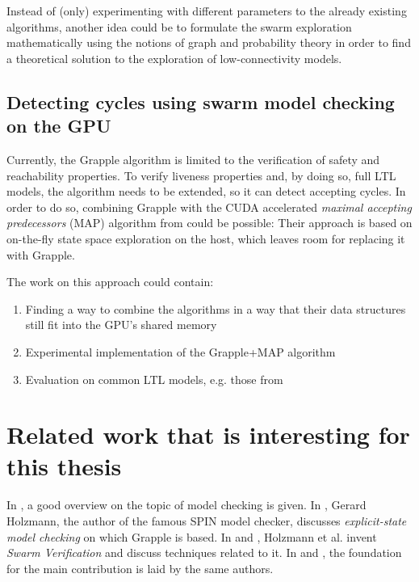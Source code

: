 \documentclass[a4paper]{scrartcl}
\begin{document}
Instead of (only) experimenting with different parameters to the already existing algorithms, another idea could be to formulate the swarm exploration mathematically using the notions of graph and probability theory in order to find a theoretical solution to the exploration of low-connectivity models.


\subsection{Detecting cycles using swarm model checking on the GPU}

Currently, the Grapple algorithm is limited to the verification of safety and reachability properties. To verify liveness properties and, by doing so, full LTL models, the algorithm needs to be extended, so it can detect accepting cycles. In order to do so, combining Grapple with the CUDA accelerated \emph{maximal accepting predecessors} (MAP) algorithm from \cite{Barnat2009.MAP} could be possible: Their approach is based on on-the-fly state space exploration on the host, which leaves room for replacing it with Grapple.

The work on this approach could contain:

\begin{enumerate}
    \item Finding a way to combine the algorithms in a way that their data structures still fit into the GPU's shared memory
    \item Experimental implementation of the Grapple+MAP algorithm
    \item Evaluation on common LTL models, e.g. those from \cite{Barnat2009.MAP}
\end{enumerate}


\section{Related work that is interesting for this thesis}

In \cite{Clarke2018.Introduction-to-Model-Checking}, a good overview on the topic of model checking is given. In \cite{Holzmann2018.Explicit-State-Model-Checking}, Gerard Holzmann, the author of the famous SPIN model checker, discusses \emph{explicit-state model checking} on which Grapple is based. In \cite{Holzmann2008.Swarm-Verification} and \cite{Holzmann2011.Swarm-Verification-Techniques}, Holzmann et al. invent \emph{Swarm Verification} and discuss techniques related to it. In \cite{Cho2018.FPGASwarm} and \cite{Bartocci2014.GPGPU-Parallel-SPIN}, the foundation for the main contribution \cite{DeFrancisco2020.Grapple} is laid by the same authors.
\end{document}
